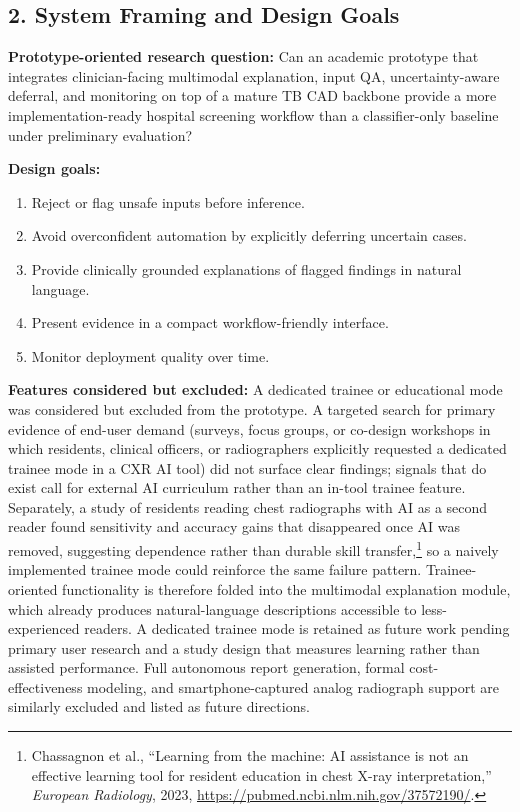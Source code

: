 \documentclass[11pt]{article}
\begin{document}
\subsection{2. System Framing and Design Goals}

\textbf{Prototype-oriented research question:} Can an academic prototype that integrates clinician-facing multimodal explanation, input QA, uncertainty-aware deferral, and monitoring on top of a mature TB CAD backbone provide a more implementation-ready hospital screening workflow than a classifier-only baseline under preliminary evaluation?

\textbf{Design goals:}
\begin{enumerate}[leftmargin=1.8em]
    \item Reject or flag unsafe inputs before inference.
    \item Avoid overconfident automation by explicitly deferring uncertain cases.
    \item Provide clinically grounded explanations of flagged findings in natural language.
    \item Present evidence in a compact workflow-friendly interface.
    \item Monitor deployment quality over time.
\end{enumerate}

\textbf{Features considered but excluded:} A dedicated trainee or educational mode was considered but excluded from the prototype. A targeted search for primary evidence of end-user demand (surveys, focus groups, or co-design workshops in which residents, clinical officers, or radiographers explicitly requested a dedicated trainee mode in a CXR AI tool) did not surface clear findings; signals that do exist call for external AI curriculum rather than an in-tool trainee feature. Separately, a study of residents reading chest radiographs with AI as a second reader found sensitivity and accuracy gains that disappeared once AI was removed, suggesting dependence rather than durable skill transfer,\footnote{Chassagnon et al., ``Learning from the machine: AI assistance is not an effective learning tool for resident education in chest X-ray interpretation,'' \textit{European Radiology}, 2023, \url{https://pubmed.ncbi.nlm.nih.gov/37572190/}.} so a naively implemented trainee mode could reinforce the same failure pattern. Trainee-oriented functionality is therefore folded into the multimodal explanation module, which already produces natural-language descriptions accessible to less-experienced readers. A dedicated trainee mode is retained as future work pending primary user research and a study design that measures learning rather than assisted performance. Full autonomous report generation, formal cost-effectiveness modeling, and smartphone-captured analog radiograph support are similarly excluded and listed as future directions.
\end{document}
